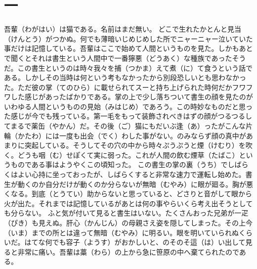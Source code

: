 \documentclass{book}
\begin{document}
\chapter*{一}
吾輩（わがはい）は猫である。名前はまだ無い。
どこで生れたかとんと見当（けんとう）がつかぬ。何でも薄暗いじめじめした所でニャーニャー泣いていた事だけは記憶している。吾輩はここで始めて人間というものを見た。しかもあとで聞くとそれは書生という人間中で一番獰悪（どうあく）な種族であったそうだ。この書生というのは時々我々を捕（つかま）えて煮（に）て食うという話である。しかしその当時は何という考もなかったから別段恐しいとも思わなかった。ただ彼の掌（てのひら）に載せられてスーと持ち上げられた時何だかフワフワした感じがあったばかりである。掌の上で少し落ちついて書生の顔を見たのがいわゆる人間というものの見始（みはじめ）であろう。この時妙なものだと思った感じが今でも残っている。第一毛をもって装飾されべきはずの顔がつるつるしてまるで薬缶（やかん）だ。その後（ご）猫にもだいぶ逢（あ）ったがこんな片輪（かたわ）には一度も出会（でく）わした事がない。のみならず顔の真中があまりに突起している。そうしてその穴の中から時々ぷうぷうと煙（けむり）を吹く。どうも咽（む）せぽくて実に弱った。これが人間の飲む煙草（たばこ）というものである事はようやくこの頃知った。
この書生の掌の裏（うち）でしばらくはよい心持に坐っておったが、しばらくすると非常な速力で運転し始めた。書生が動くのか自分だけが動くのか分らないが無暗（むやみ）に眼が廻る。胸が悪くなる。到底（とうてい）助からないと思っていると、どさりと音がして眼から火が出た。それまでは記憶しているがあとは何の事やらいくら考え出そうとしても分らない。
ふと気が付いて見ると書生はいない。たくさんおった兄弟が一疋（ぴき）も見えぬ。肝心（かんじん）の母親さえ姿を隠してしまった。その上今（いま）までの所とは違って無暗（むやみ）に明るい。眼を明いていられぬくらいだ。はてな何でも容子（ようす）がおかしいと、のそのそ這（は）い出して見ると非常に痛い。吾輩は藁（わら）の上から急に笹原の中へ棄てられたのである。
\end{document}
